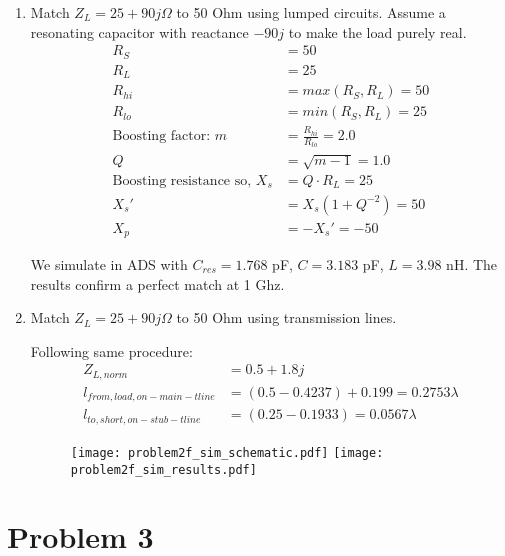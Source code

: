 \begin{enumerate}[label=(\alph*)]
    \item Match $Z_L = 25 + 90j \Omega$ to 50 Ohm using lumped circuits.
    Assume a resonating capacitor with reactance $-90j$ to make the load purely real.
    \begin{align*}
        R_S &= 50 \\
        R_L &= 25 \\
        R_{hi} &= max(R_S, R_L) = 50 \\
        R_{lo} &= min(R_S, R_L) = 25 \\
        \text{Boosting factor: } m &= \frac{R_{hi}}{R_{lo}} = 2.0 \\
        Q &= \sqrt{m-1} = 1.0 \\
        \text{Boosting resistance so, } X_s &= Q \cdot R_L = 25 \\
        X_s' &= X_s(1 + Q^{-2}) = 50 \\
        X_p &= -X_s' = -50
    \end{align*}

    We simulate in ADS with $C_{res} = 1.768$ pF, $C = 3.183$ pF, $L = 3.98$ nH. The results confirm a perfect match at 1 Ghz.

    \item Match $Z_L = 25 + 90j \Omega$ to 50 Ohm using transmission lines.

    Following same procedure:
    \begin{align*}
        Z_{L,norm} &= 0.5 + 1.8j \\
        l_{from,load,on-main-tline} &= (0.5 - 0.4237) + 0.199 = 0.2753 \lambda  \\
        l_{to,short,on-stub-tline} &= (0.25 - 0.1933) = 0.0567 \lambda
    \end{align*}
    \begin{figure}[H]
        \texttt{[image: problem2f\_sim\_schematic.pdf]}
        \endminipage\hfill
        \texttt{[image: problem2f\_sim\_results.pdf]}
        \endminipage
    \end{figure}

\end{enumerate}

\section*{Problem 3}

